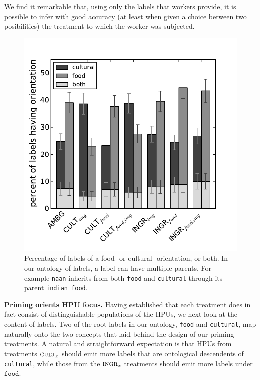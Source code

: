 \documentclass[letterpaper, 11pt, twocolumn]{article}
\begin{document}
We find it remarkable that, using only the labels that workers provide, it is
possible to infer with good accuracy (at least when given a choice between 
two posibilities)  the treatment to which the worker was 
subjected.


\begin{figure}
	\includegraphics[scale=0.65]{../figs/valenceComparison.pdf}
	\caption{Percentage of labels of a food- or cultural- orientation, or
	both.  In our ontology of labels, a label can have multiple parents. 
	For example \texttt{naan} inherits from both \texttt{food} and 
	\texttt{cultural} through its parent \texttt{indian food}.}
	\label{fig:valence}
\end{figure}


\textbf{Priming orients HPU focus.}
Having established that each treatment does in fact consist of distinguishable 
populations of the HPUs, we next look at the content of labels.  Two of the
root labels in our ontology, \texttt{food} and \texttt{cultural}, map naturally
onto the two concepts that laid behind the design of our priming treatments.
A natural and straightforward expectation is that HPUs from treatments 
$\textsc{cult}_x$ should emit more labels that are ontological descendents of
\texttt{cultural}, while those from the $\textsc{ingr}_x$ treatments should
emit more labels under $\texttt{food}$.
\end{document}
